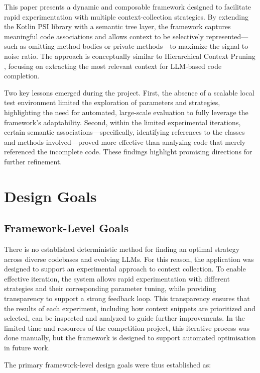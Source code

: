 \documentclass[conference]{IEEEtran}
\begin{document}
This paper presents a dynamic and composable framework designed to facilitate rapid experimentation
 with multiple context-collection strategies. By extending the Kotlin PSI library with a semantic tree layer, 
 the framework captures meaningful code associations and allows context to be selectively represented—such as 
 omitting method bodies or private methods—to maximize the signal-to-noise ratio. The approach is conceptually 
 similar to Hierarchical Context Pruning \cite{hcp}, focusing on extracting the most relevant context for LLM-based code completion.

Two key lessons emerged during the project. First, the absence of a scalable local test environment 
limited the exploration of parameters and strategies, highlighting the need for automated, 
large-scale evaluation to fully leverage the framework’s adaptability. Second, within the limited experimental 
iterations, certain semantic associations—specifically, identifying references to the classes and methods 
involved—proved more effective than analyzing code that merely referenced the incomplete code. 
These findings highlight promising directions for further refinement.

\section{Design Goals}

\subsection{Framework-Level Goals}
There is no established deterministic method for finding an optimal strategy across diverse codebases and evolving LLMs. 
For this reason, the application was designed to support an experimental approach to context collection. 
To enable effective iteration, the system allows rapid experimentation with different strategies and their 
corresponding parameter tuning, while providing transparency to support a strong feedback loop. 
This transparency ensures that the results of each experiment, including how context snippets are prioritized and selected, 
can be inspected and analyzed to guide further improvements.  In the limited time and resources of the competition project, 
this iterative process was done manually, but the framework is designed to support automated optimisation in future work.

The primary framework-level design goals were thus established as:
\end{document}

